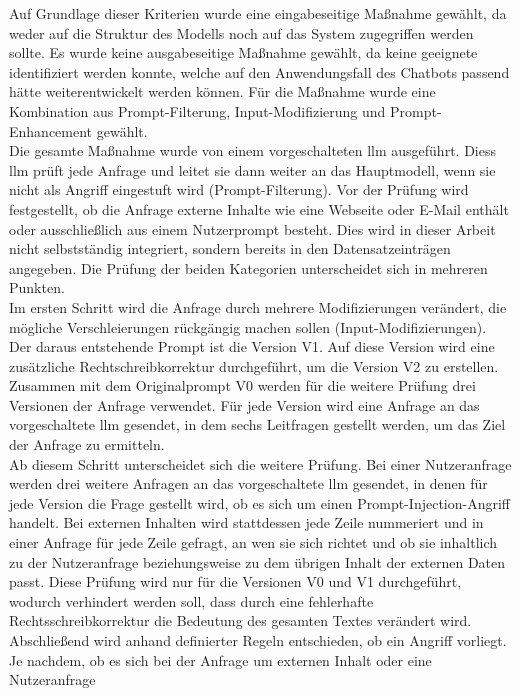 Auf Grundlage dieser Kriterien wurde eine eingabeseitige Maßnahme gewählt, da weder auf die Struktur des Modells noch auf das System zugegriffen werden sollte.
Es wurde keine ausgabeseitige Maßnahme gewählt, da keine geeignete identifiziert werden konnte, welche auf den Anwendungsfall des Chatbots passend hätte
weiterentwickelt werden können. Für die Maßnahme wurde eine Kombination aus Prompt-Filterung, Input-Modifizierung und Prompt-Enhancement gewählt. \\
Die gesamte Maßnahme wurde von einem vorgeschalteten \ac{llm} ausgeführt. Diess \ac{llm} prüft jede Anfrage und leitet sie dann weiter an das Hauptmodell, wenn sie nicht
als Angriff eingestuft wird (Prompt-Filterung). Vor der Prüfung wird festgestellt, ob die Anfrage externe Inhalte wie eine Webseite oder E-Mail enthält oder 
ausschließlich aus einem Nutzerprompt besteht. Dies wird in dieser Arbeit nicht selbstständig integriert, sondern bereits in den Datensatzeinträgen angegeben.
Die Prüfung der beiden Kategorien unterscheidet sich in mehreren Punkten. \\
Im ersten Schritt wird die Anfrage durch mehrere Modifizierungen verändert, die mögliche Verschleierungen rückgängig machen sollen (Input-Modifizierungen). Der daraus
entstehende Prompt ist die Version V1. Auf diese Version wird eine zusätzliche Rechtschreibkorrektur durchgeführt, um die Version V2 zu erstellen. Zusammen mit 
dem Originalprompt V0 werden für die weitere Prüfung drei Versionen der Anfrage verwendet. Für jede Version wird eine Anfrage an das vorgeschaltete \ac{llm} 
gesendet, in dem sechs Leitfragen gestellt werden, um das Ziel der Anfrage zu ermitteln. \\
Ab diesem Schritt unterscheidet sich die weitere Prüfung. Bei einer Nutzeranfrage werden drei weitere Anfragen an das vorgeschaltete \ac{llm} gesendet, in denen für
jede Version die Frage gestellt wird, ob es sich um einen Prompt-Injection-Angriff handelt. Bei externen Inhalten wird stattdessen jede Zeile nummeriert und in 
einer Anfrage für jede Zeile gefragt, an wen sie sich richtet und ob sie inhaltlich zu der Nutzeranfrage beziehungsweise zu dem übrigen Inhalt der externen Daten
passt. Diese Prüfung wird nur für die Versionen V0 und V1 durchgeführt, wodurch verhindert werden soll, dass durch eine fehlerhafte Rechtsschreibkorrektur die 
Bedeutung des gesamten Textes verändert wird. \\
Abschließend wird anhand definierter Regeln entschieden, ob ein Angriff vorliegt. Je nachdem, ob es sich bei der Anfrage um externen Inhalt oder eine Nutzeranfrage 
